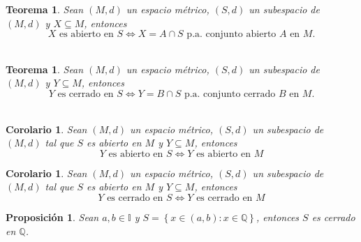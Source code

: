 \documentclass[oneside]{book} %
\theoremstyle{Teorema}
\newtheorem{Teorema}[Definicion]{Teorema}
\newtheorem{Corolario}[Definicion]{Corolario}
\newtheorem{Proposicion}[Definicion]{Proposición}
\theoremstyle{Ejemplos}
\theoremstyle{[Obs]}
\renewcommand{\{}{\left\lbrace} %
\renewcommand{\}}{\right\rbrace} %
\newcommand{\n}{\cap} %
\renewcommand{\sc}{\subseteq} %
\begin{document}
			\begin{Teorema}
				
				Sean $(M, d)$ un espacio métrico, $(S, d)$ un subespacio de $(M, d)$ y $X \sc M$, entonces \\

				\[ X \text{ es abierto en } S \Leftrightarrow X = A \n S \text{ p.a. conjunto abierto } A \text{ en } M. \] \\

			\end{Teorema}

			\begin{Teorema}
				
				Sean $(M, d)$ un espacio métrico, $(S, d)$ un subespacio de $(M, d)$ y $Y \sc M$, entonces \\

				\[ Y \text{ es cerrado en } S \Leftrightarrow Y = B \n S \text{ p.a. conjunto cerrado } B \text{ en } M. \] \\

			\end{Teorema}

			\begin{Corolario}
				
				Sean $(M, d)$ un espacio métrico, $(S, d)$ un subespacio de $(M, d)$ tal que $S$ es abierto en $M$ y $Y \sc M$, entonces \\

				\[ Y \text{ es abierto en } S \Leftrightarrow Y \text{ es abierto en } M \]

			\end{Corolario}

			\begin{Corolario}
				
				Sean $(M, d)$ un espacio métrico, $(S, d)$ un subespacio de $(M, d)$ tal que $S$ es abierto en $M$ y $Y \sc M$, entonces \\

				\[ Y \text{ es cerrado en } S \Leftrightarrow Y \text{ es cerrado en } M \]

			\end{Corolario}

			\begin{Proposicion}
				
				Sean $a, b \in \mathbb{I}$ y $S = \{ x \in (a, b) : x \in \mathbb{Q} \}$, entonces $S$ es cerrado en $\mathbb{Q}$. \\

			\end{Proposicion}
\end{document}

